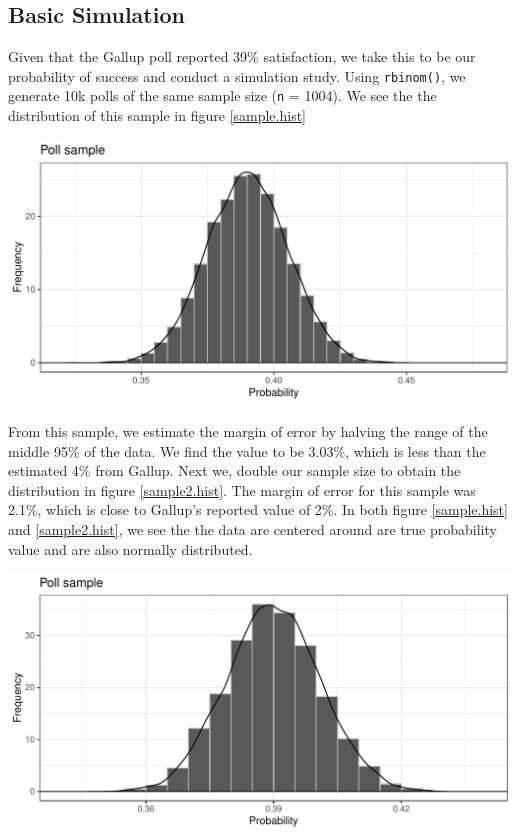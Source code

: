 \documentclass{article}\usepackage[]{graphicx}\usepackage[]{xcolor}
\newenvironment{Figure}
  {\par\medskip\noindent\minipage{\linewidth}}
  {\endminipage\par\medskip}
\begin{document}
\begin{multicols}{2}
\section{Basic Simulation}
Given that the Gallup poll reported 39\% satisfaction, we take this to be our probability of success and conduct a simulation study. Using \texttt{rbinom()}, we generate 10k polls of the same sample size (\texttt{n} = 1004). We see the the distribution of this sample in figure \ref{sample.hist}

\begin{Figure}
\begin{centering}
\includegraphics[width=1\columnwidth]{plots/Rplot1.pdf}
\end{centering}
 \label{sample.hist}
\end{Figure}

From this sample, we estimate the margin of error by halving the range of the middle 95\% of the data. We find the value to be 3.03\%, which is less than the estimated 4\% from Gallup. Next we, double our sample size to obtain the distribution in figure \ref{sample2.hist}. The margin of error for this sample was 2.1\%, which is close to Gallup's reported value of 2\%. In both figure \ref{sample.hist} and \ref{sample2.hist}, we see the the data are centered around are true probability value and are also normally distributed.

\begin{Figure}
\begin{centering}
\includegraphics[width=1\columnwidth]{plots/Rplot2.pdf}
\end{centering}
 \label{sample2.hist}
\end{Figure}


\end{multicols}
\end{document}
